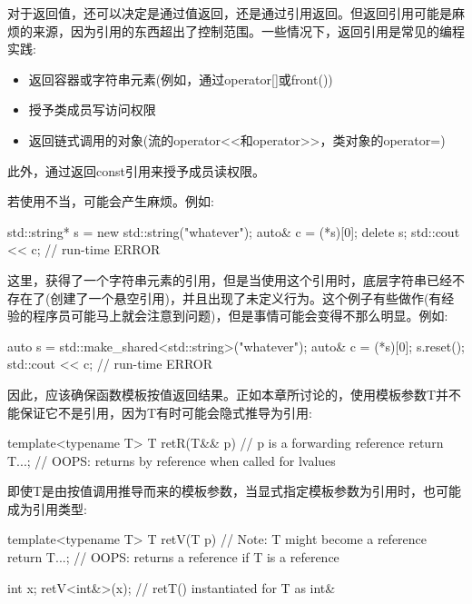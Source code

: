 

对于返回值，还可以决定是通过值返回，还是通过引用返回。但返回引用可能是麻烦的来源，因为引用的东西超出了控制范围。一些情况下，返回引用是常见的编程实践:

\begin{itemize}
\item 
返回容器或字符串元素(例如，通过operator[]或front())

\item 
授予类成员写访问权限

\item 
返回链式调用的对象(流的operator<{}<和operator>{}>，类对象的operator=)
\end{itemize}

此外，通过返回const引用来授予成员读权限。

若使用不当，可能会产生麻烦。例如:

\begin{cpp}
std::string* s = new std::string("whatever");
auto& c = (*s)[0];
delete s;
std::cout << c; // run-time ERROR
\end{cpp}

这里，获得了一个字符串元素的引用，但是当使用这个引用时，底层字符串已经不存在了(创建了一个悬空引用)，并且出现了未定义行为。这个例子有些做作(有经验的程序员可能马上就会注意到问题)，但是事情可能会变得不那么明显。例如:

\begin{cpp}
auto s = std::make_shared<std::string>("whatever");
auto& c = (*s)[0];
s.reset();
std::cout << c; // run-time ERROR
\end{cpp}

因此，应该确保函数模板按值返回结果。正如本章所讨论的，使用模板参数T并不能保证它不是引用，因为T有时可能会隐式推导为引用:

\begin{cpp}
template<typename T>
T retR(T&& p) // p is a forwarding reference
{
	return T{...}; // OOPS: returns by reference when called for lvalues
}
\end{cpp}

即使T是由按值调用推导而来的模板参数，当显式指定模板参数为引用时，也可能成为引用类型:

\begin{cpp}
template<typename T>
T retV(T p) // Note: T might become a reference
{
	return T{...}; // OOPS: returns a reference if T is a reference
}

int x;
retV<int&>(x); // retT() instantiated for T as int&
\end{cpp}

